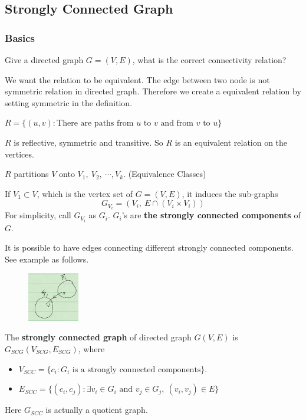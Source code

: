 \documentclass[en,hazy,blue,normal,12pt]{elegantnote}
\begin{document}
\subsection{Strongly Connected Graph}

\subsubsection{Basics}
Give a directed graph $G = (V, E)$, what is the correct connectivity relation?

We want the relation to be equivalent. The edge between two node is not 
symmetric relation in directed graph. Therefore we create a equivalent relation 
by setting symmetric in the definition.

\begin{definition}
 $R = \{(u, v): \text{There are paths from $u$ to $v$ and from $v$ to $u$}\}$
\end{definition}

$R$ is reflective, symmetric and transitive. So $R$ is an equivalent relation 
on the vertices.

\begin{definition}
$R$ partitions $V$ onto $V_1,~V_2,~\cdots, V_k$. (Equivalence Classes)

If $V_1 \subset V$, which is the vertex set of $G = (V, E)$, it induces the 
sub-graphs
\[G_{V_i} = (V_i, ~E \cap (V_i \times V_i) )\]
For simplicity, call $G_{V_i}$ as $G_i$. $G_i$'s are \textbf{the 
strongly connected components} of $G$.
\end{definition}


It is possible to have edges connecting different strongly connected 
components. See example as follows.
\begin{figure}[H]
\centering
\includegraphics[width=0.2\textwidth]{edge-strongly-connected-components.png}
\end{figure}

\begin{definition}
 The \textbf{strongly connected graph} of directed graph $G(V, E)$ is 
$G_{SCG}(V_{SCG}, E_{SCG})$, where
\begin{itemize}
 \item $V_{SCC} = \{c_i: G_i \text{ is a strongly connected components}\}$.
 \item $E_{SCC} = \{(c_i, c_j): \exists v_i \in G_i \text{ and }v_j \in G_j, 
~(v_i, v_j) \in E \}$
\end{itemize}
\end{definition}
Here $G_{SCC}$ is actually a quotient graph.
\end{document}
